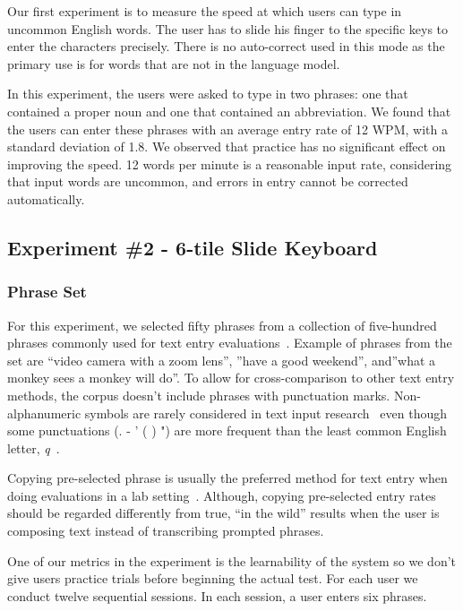 Our first experiment is to measure the speed at which users can type in uncommon English words.  The user has to slide his finger to the specific keys to enter the characters precisely.  There is no auto-correct used in this mode as the primary use is for words that are not in the language model.  

In this experiment, the users were asked to type in two phrases: one that contained a proper noun and one that contained an abbreviation.  We found that the users can enter these phrases with an average entry rate of 12 WPM, with a standard deviation of 1.8.  We observed that practice has no significant effect on improving the speed. 
12 words per minute is a reasonable input rate, considering that input words are uncommon, and errors in entry cannot be corrected automatically. 


\subsection{Experiment \#2 - 6-tile Slide Keyboard}

\subsubsection{Phrase Set}
For this experiment, we selected fifty phrases from a collection of five-hundred phrases commonly used for text entry evaluations~\cite{mackenzie2003phrase}.
Example of phrases from the set are ``video camera with a zoom lens'', ''have a good weekend'', and''what a monkey sees a monkey will do''.
To allow for cross-comparison to other text entry methods, the corpus doesn't include phrases with punctuation marks.
Non-alphanumeric symbols are rarely considered in text input research~\cite{mackenzie2003phrase} even though some punctuations (. - ' ( ) ") are more frequent than the least common English letter,  \textit{q}~\cite{malikpunctuation}.
 
Copying pre-selected phrase is usually the preferred method for text entry when doing evaluations in a lab setting~\cite{mackenzie2002character, mackenzie2003phrase}.
Although, copying pre-selected entry rates should be regarded differently from true, ``in the wild'' results when the user is composing text instead of transcribing prompted phrases.


One of our metrics in the experiment is the learnability of the system so we don't give users practice trials before beginning the actual test.
For each user we conduct twelve sequential sessions.
In each session, a user enters six phrases.


